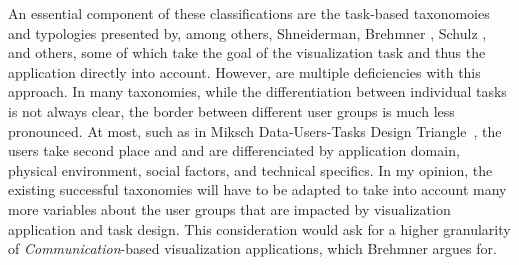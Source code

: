 An essential component of these classifications are the task-based taxonomoies and typologies presented by, among others, Shneiderman, Brehmner \etal , Schulz \etal , and others, some of which take the goal of the visualization task and thus the application directly into account.  However, are multiple deficiencies with this approach.  In many taxonomies, while the differentiation between individual tasks is not always clear, the border between different user groups is much less pronounced.  At most, such as in Miksch \etal Data-Users-Tasks Design Triangle~\cite{miksch2014matter}, the users take second place and and are differenciated by application domain, physical environment, social factors, and technical specifics.  In my opinion, the existing successful taxonomies will have to be adapted to take into account many more variables about the user groups that are impacted by visualization application and task design.  This consideration would ask for a higher granularity of \emph{Communication}-based visualization applications, which Brehmner \etal argues for.

